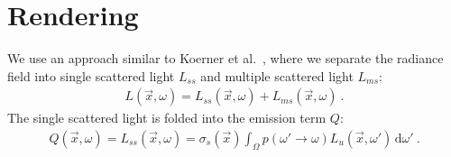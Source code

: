 \documentclass{egpubl}
\newcommand{\ud}{\,\mathrm{d}} %
\newcommand{\nocontentsline}[3]{}
\newcommand{\tocless}[2]{\bgroup\let\addcontentsline=\nocontentsline#1{#2}\egroup}
\begin{document}




\tocless\section{Rendering \label{sec:rendering}}

We use an approach similar to Koerner et al.~\cite{Koerner14}, where we separate the radiance field into single scattered light $L_{ss}$ and multiple scattered light $L_{ms}$:
\begin{align}
L\left(\vec{x},\omega\right) = L_{ss}\left(\vec{x},\omega\right) + L_{ms}\left(\vec{x},\omega\right)
\ .
\end{align}
The single scattered light is folded into the emission term $Q$:
\begin{align}
Q(\vec{x}, \omega) = L_{ss}(\vec{x}, \omega) = \sigma_s\left(\vec{x}\right)\int_\Omega{ p\left(\omega'\rightarrow\omega\right) L_{u}\left(\vec{x}, \omega'\right)\ud\omega' }
\ .
\end{align}
\end{document}
